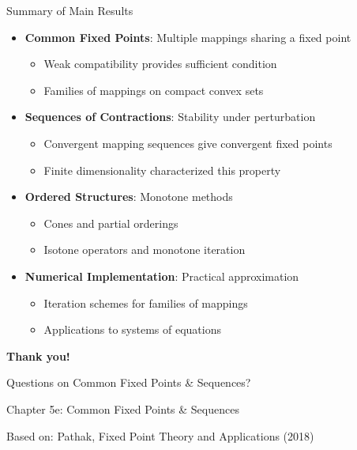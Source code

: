 \documentclass[aspectratio=169,10pt]{beamer}
\begin{document}
\begin{frame}{Summary of Main Results}
    \begin{itemize}
        \item \textbf{Common Fixed Points}: Multiple mappings sharing a fixed point
        \begin{itemize}
            \item Weak compatibility provides sufficient condition
            \item Families of mappings on compact convex sets
        \end{itemize}

        \item \textbf{Sequences of Contractions}: Stability under perturbation
        \begin{itemize}
            \item Convergent mapping sequences give convergent fixed points
            \item Finite dimensionality characterized this property
        \end{itemize}

        \item \textbf{Ordered Structures}: Monotone methods
        \begin{itemize}
            \item Cones and partial orderings
            \item Isotone operators and monotone iteration
        \end{itemize}

        \item \textbf{Numerical Implementation}: Practical approximation
        \begin{itemize}
            \item Iteration schemes for families of mappings
            \item Applications to systems of equations
        \end{itemize}
    \end{itemize}
\end{frame}

\begin{frame}
    \centering
    \vspace{1cm}

    \Large \textbf{Thank you!}

    \medskip

    \Large Questions on Common Fixed Points \& Sequences?

    \medskip

    \small
    Chapter 5e: Common Fixed Points \& Sequences

    \tiny
    Based on: Pathak, Fixed Point Theory and Applications (2018)
\end{frame}
\end{document}
